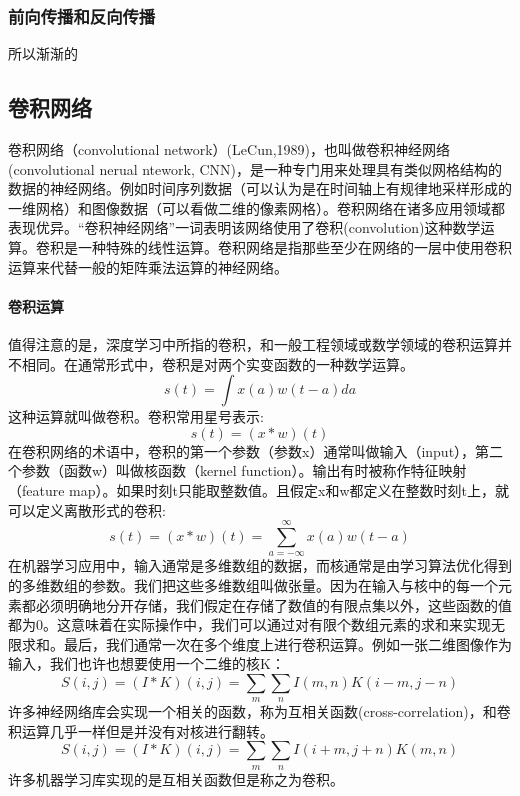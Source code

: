 \documentclass[12pt,a4paper,titlepage]{article}
\begin{document}
\subsubsection*{前向传播和反向传播}

所以渐渐的
\subsection*{卷积网络}
卷积网络（convolutional network）(LeCun,1989)，也叫做卷积神经网络(convolutional nerual ntework, CNN)，是一种专门用来处理具有类似网格结构的数据的神经网络。例如时间序列数据（可以认为是在时间轴上有规律地采样形成的一维网格）和图像数据（可以看做二维的像素网格）。卷积网络在诸多应用领域都表现优异。“卷积神经网络”一词表明该网络使用了卷积(convolution)这种数学运算。卷积是一种特殊的线性运算。卷积网络是指那些至少在网络的一层中使用卷积运算来代替一般的矩阵乘法运算的神经网络。
\paragraph{卷积运算}
值得注意的是，深度学习中所指的卷积，和一般工程领域或数学领域的卷积运算并不相同。在通常形式中，卷积是对两个实变函数的一种数学运算。
\[
s(t)=\int x(a)w(t-a)da
\]
这种运算就叫做卷积。卷积常用星号表示:
\[
s(t) = (x*w)(t)
\]
在卷积网络的术语中，卷积的第一个参数（参数x）通常叫做输入（input），第二个参数（函数w）叫做核函数（kernel function）。输出有时被称作特征映射（feature map）。如果时刻t只能取整数值。且假定x和w都定义在整数时刻t上，就可以定义离散形式的卷积:
\[
s(t) = (x*w)(t) = \sum_{a=-\infty}^{\infty}x(a)w(t-a)
\]
在机器学习应用中，输入通常是多维数组的数据，而核通常是由学习算法优化得到的多维数组的参数。我们把这些多维数组叫做张量。因为在输入与核中的每一个元素都必须明确地分开存储，我们假定在存储了数值的有限点集以外，这些函数的值都为0。这意味着在实际操作中，我们可以通过对有限个数组元素的求和来实现无限求和。最后，我们通常一次在多个维度上进行卷积运算。例如一张二维图像作为输入，我们也许也想要使用一个二维的核K：
\[
S(i,j) = (I*K)(i,j) = \sum_m\sum_nI(m,n)K(i-m,j-n)
\]
许多神经网络库会实现一个相关的函数，称为互相关函数(cross-correlation)，和卷积运算几乎一样但是并没有对核进行翻转。
\[
S(i,j) = (I*K)(i,j) = \sum_m\sum_nI(i+m,j+n)K(m,n)
\]
许多机器学习库实现的是互相关函数但是称之为卷积。
\end{document}
